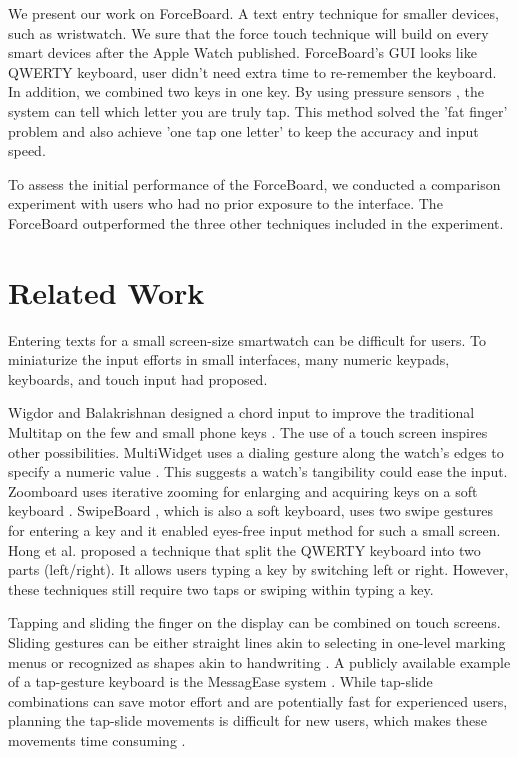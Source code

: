 \documentclass{sigchi}
\begin{document}
We present our work on ForceBoard. A text entry technique for smaller devices, such as wristwatch. We sure that the force touch technique will build on every smart devices after the Apple Watch published. ForceBoard's GUI looks like QWERTY keyboard, user didn't need extra time to re-remember the keyboard. In addition, we combined two keys in one key. By using pressure sensors , the system can tell which letter you are truly tap. This method solved the 'fat finger' problem and also achieve 'one tap one letter' to keep the accuracy and input speed.

To assess the initial performance of the ForceBoard, we conducted a comparison experiment with users who had no prior exposure to the interface. The ForceBoard outperformed the three other techniques included in the experiment.

\section{Related Work}
Entering texts for a small screen-size smartwatch can be difficult for users. To miniaturize the input efforts in small interfaces, many numeric keypads, keyboards, and touch input had proposed. 

Wigdor and Balakrishnan designed a chord input to improve the traditional Multitap on the few and small phone keys \cite{Wigdor:2004:CCC:985692.985703}. The use of a touch screen inspires other possibilities. MultiWidget uses a dialing gesture along the watch's edges to specify a numeric value \cite{4067721}. This suggests a watch's tangibility could ease the input. Zoomboard uses iterative zooming for enlarging and acquiring keys on a soft keyboard \cite{Oney:2013:ZDQ:2470654.2481387}. SwipeBoard  \cite{Chen:2014:STE:2642918.2647354}, which is also a soft keyboard, uses two swipe gestures for entering a key and it enabled eyes-free input method for such a small screen. Hong et al. \cite{Hong:2015:SSS:2702123.2702273} proposed a technique that split the QWERTY keyboard into two parts (left/right). It allows users typing a key by switching left or right. However, these techniques still require two taps or swiping within typing a key.

Tapping and sliding the finger on the display can be combined on touch screens. Sliding gestures can be either straight lines akin to selecting in one-level marking menus\cite{Isokoski:2004:PMS:985692.985746} or recognized as shapes akin to handwriting \cite{Isokoski:2010:MET:1868914.1869004}. A publicly available example of a tap-gesture keyboard is the MessagEase system \cite{Nesbat:2003:SFF:958432.958437}. While tap-slide combinations can save motor effort and are potentially fast for experienced users, planning the tap-slide movements is difficult for new users, which makes these movements time consuming \cite{Isokoski:2004:PMS:985692.985746}.
\end{document}
